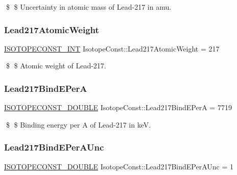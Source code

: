 \$ \$ Uncertainty in atomic mass of Lead-\/217 in amu. \mbox{\label{group___isotope_const-_lead-_pb217_ga62302e2166c7826164afce005b6af80b}} 
\subsubsection{\texorpdfstring{Lead217\+Atomic\+Weight}{Lead217AtomicWeight}}
{\footnotesize\ttfamily \mbox{\hyperlink{group___isotope_const-_macros_ga5f18360b3e99483a35c32d789e62621c}{I\+S\+O\+T\+O\+P\+E\+C\+O\+N\+S\+T\+\_\+\+I\+NT}} Isotope\+Const\+::\+Lead217\+Atomic\+Weight = 217}

\$ \$ Atomic weight of Lead-\/217. \mbox{\label{group___isotope_const-_lead-_pb217_gaf7bae0aeb6197550ed6366ed408909c7}} 
\subsubsection{\texorpdfstring{Lead217\+Bind\+E\+PerA}{Lead217BindEPerA}}
{\footnotesize\ttfamily \mbox{\hyperlink{group___isotope_const-_macros_ga8f45a7272ce02c0b4c65c44636ed719a}{I\+S\+O\+T\+O\+P\+E\+C\+O\+N\+S\+T\+\_\+\+D\+O\+U\+B\+LE}} Isotope\+Const\+::\+Lead217\+Bind\+E\+PerA = 7719}

\$ \$ Binding energy per A of Lead-\/217 in keV. \mbox{\label{group___isotope_const-_lead-_pb217_ga9a17acb7e9aeef68de6ab5605f7450f0}} 
\subsubsection{\texorpdfstring{Lead217\+Bind\+E\+Per\+A\+Unc}{Lead217BindEPerAUnc}}
{\footnotesize\ttfamily \mbox{\hyperlink{group___isotope_const-_macros_ga8f45a7272ce02c0b4c65c44636ed719a}{I\+S\+O\+T\+O\+P\+E\+C\+O\+N\+S\+T\+\_\+\+D\+O\+U\+B\+LE}} Isotope\+Const\+::\+Lead217\+Bind\+E\+Per\+A\+Unc = 1}

